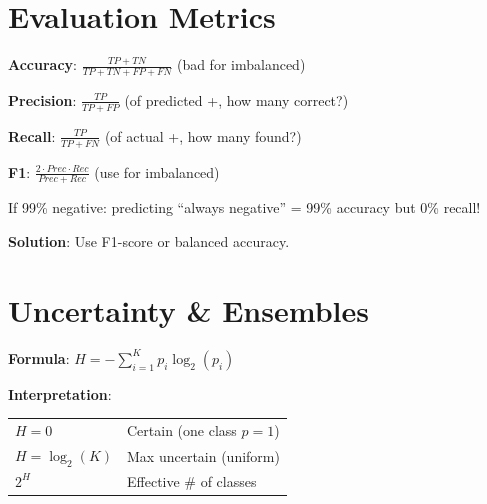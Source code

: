 \documentclass[11pt,a4paper]{article}
\begin{document}
\section{Evaluation Metrics}

\begin{definitionbox}

\textbf{Accuracy}: $\frac{TP + TN}{TP+TN+FP+FN}$ (bad for imbalanced)

\textbf{Precision}: $\frac{TP}{TP + FP}$ (of predicted +, how many correct?)

\textbf{Recall}: $\frac{TP}{TP + FN}$ (of actual +, how many found?)

\textbf{F1}: $\frac{2 \cdot Prec \cdot Rec}{Prec + Rec}$ (use for imbalanced)
\end{definitionbox}

\begin{warningbox}

If 99\% negative: predicting ``always negative'' = 99\% accuracy but 0\% recall!

\textbf{Solution}: Use F1-score or balanced accuracy.
\end{warningbox}

\section{Uncertainty \& Ensembles}

\begin{definitionbox}

\textbf{Formula}: $H = -\sum_{i=1}^{K} p_i \log_2(p_i)$

\textbf{Interpretation}:
\begin{tabular}{@{}l|l@{}}
$H = 0$ & Certain (one class $p=1$) \\
$H = \log_2(K)$ & Max uncertain (uniform) \\
$2^H$ & Effective \# of classes \\
\end{tabular}
\end{definitionbox}
\end{document}
